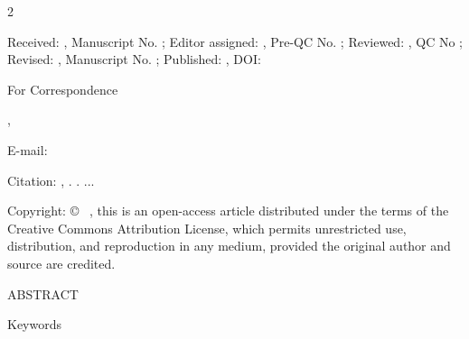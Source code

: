 \documentclass[10pt]{article}
\begin{document}
\begin{paracol}{2}
  \begin{sloppypar}
  \franklinbook\fontsize{9}{12.5}\selectfont\color{black}
  
  {\franklindemi Received:} , Manuscript No. ; {\franklindemi Editor assigned:} , Pre-QC No. ; {\franklindemi Reviewed:} , QC No ; {\franklindemi Revised:} , Manuscript No. ; {\franklindemi Published:} , DOI: \par
  \vspace{9pt}

  {\franklindemi *For Correspondence}\par
  \vspace{2pt}
  , \par
  \vspace{9pt}

  {\franklindemi E-mail:} \par
  \vspace{9pt}

  {\franklindemi Citation:} , . . ...\par
  \vspace{9pt}

  {\franklindemi Copyright:} \copyright\  , this is an open-access article distributed under the terms of the Creative Commons Attribution License, which permits unrestricted use, distribution, and reproduction in any medium, provided the original author and source are credited.
  \end{sloppypar}

\switchcolumn
  \begin{otherlanguage}{\VAR{lang_name}}
    {\centering\franklindemi\fontsize{11}{13}\selectfont ABSTRACT\par}
    \vspace{3pt}
    {\franklinbook\fontsize{9.5}{13}\selectfont {}\par}
    \vspace{10pt}

  {\centering\franklindemi\fontsize{11}{13}\selectfont Keywords\par}
  \vspace{3pt}
  {\franklinbook\fontsize{9.5}{13}\selectfont {}\par}
  \end{otherlanguage}
\end{paracol}
\end{document}
